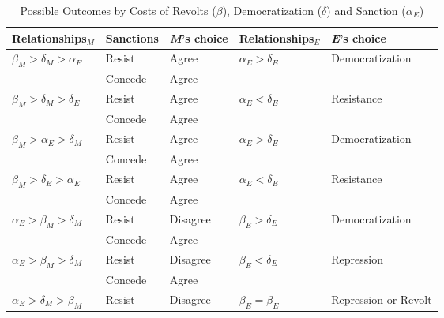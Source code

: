 \documentclass[11pt]{article}
\begin{document}
\begin{table}[!ht]
	\centering
	\caption{Possible Outcomes by Costs of Revolts ($\beta$), Democratization ($\delta$) and Sanction ($\alpha_{E}$)}
	\footnotesize
	\vspace{0.2cm}
	\begin{tabular}{ p{3cm} p{2cm} p{2cm} p{3cm} p{3cm} }
		\toprule
		\multicolumn{1}{p{3cm}}{Relationships$_{M}$} & \multicolumn{1}{p{2cm}}{Sanctions} & \multicolumn{1}{p{2cm}}{\textit{M}'s choice} & \multicolumn{1}{p{3cm}}{Relationships$_{E}$} & \multicolumn{1}{p{3cm}}{\textit{E}'s choice} \\
		\midrule
		\rowcolor{Gray}
		$\beta_{M} > \delta_{M} > \alpha_{E}$	& Resist   & Agree    & $\alpha_{E} > \delta_{E}$ & Democratization\\
		\rowcolor{Gray}
		                                      & Concede  & Agree    &                           &                \\
    $\beta_{M} > \delta_{M} > \delta_{E}$	& Resist   & Agree    & $\alpha_{E} < \delta_{E}$ & Resistance     \\
		                                      & Concede  & Agree    &                           &                \\
    \rowcolor{Gray}
		$\beta_{M} > \alpha_{E} > \delta_{M}$	& Resist   & Agree    & $\alpha_{E} > \delta_{E}$ & Democratization\\
		\rowcolor{Gray}
		                                      & Concede  & Agree    &                           &                \\
		$\beta_{M} > \delta_{E} > \alpha_{E}$	& Resist   & Agree    & $\alpha_{E} < \delta_{E}$ & Resistance     \\
		                                      & Concede  & Agree    &                           &                \\
		\rowcolor{Gray}
    $\alpha_{E} > \beta_{M} > \delta_{M}$	& Resist   & Disagree & $\beta_{E} > \delta_{E}$  & Democratization\\
    \rowcolor{Gray}
		                                      & Concede  & Agree    &                           &                \\
    $\alpha_{E} > \beta_{M} > \delta_{M}$	& Resist   & Disagree & $\beta_{E} < \delta_{E}$  & Repression     \\
                                          & Concede  & Agree    &                           &                \\
		$\alpha_{E} > \delta_{M} > \beta_{M}$	& Resist   & Disagree  & $\beta_{E} = \beta_{E}$   & Repression or Revolt \\

\end{tabular}
\end{table}
\end{document}
